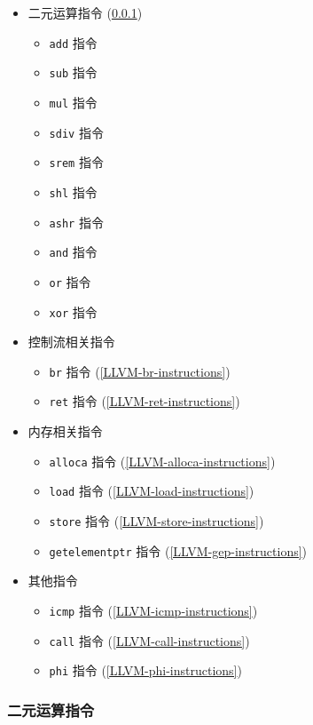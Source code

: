 \begin{itemize}
  \item 二元运算指令 (\ref{LLVM-binary-instructions})
    \begin{itemize}
      \item \texttt{add} 指令
      \item \texttt{sub} 指令
      \item \texttt{mul} 指令
      \item \texttt{sdiv} 指令
      \item \texttt{srem} 指令
      \item \texttt{shl} 指令
      \item \texttt{ashr} 指令
      \item \texttt{and} 指令
      \item \texttt{or} 指令
      \item \texttt{xor} 指令
    \end{itemize}
  \item 控制流相关指令
    \begin{itemize}
      \item \texttt{br} 指令 (\ref{LLVM-br-instructions})
      \item \texttt{ret} 指令 (\ref{LLVM-ret-instructions})
    \end{itemize}
  \item 内存相关指令
    \begin{itemize}
      \item \texttt{alloca} 指令 (\ref{LLVM-alloca-instructions})
      \item \texttt{load} 指令 (\ref{LLVM-load-instructions})
      \item \texttt{store} 指令 (\ref{LLVM-store-instructions})
      \item \texttt{getelementptr} 指令 (\ref{LLVM-gep-instructions})
    \end{itemize}
  \item 其他指令
    \begin{itemize}
      \item \texttt{icmp} 指令 (\ref{LLVM-icmp-instructions})
      \item \texttt{call} 指令 (\ref{LLVM-call-instructions})
      \item \texttt{phi} 指令 (\ref{LLVM-phi-instructions})
    \end{itemize}
\end{itemize}

\subsubsection{二元运算指令}\label{LLVM-binary-instructions}

